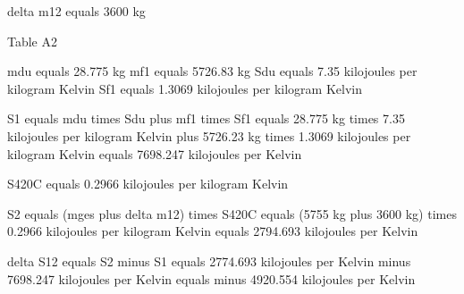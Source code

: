 delta m12 equals 3600 kg  

Table A2  

mdu equals 28.775 kg  
mf1 equals 5726.83 kg  
Sdu equals 7.35 kilojoules per kilogram Kelvin  
Sf1 equals 1.3069 kilojoules per kilogram Kelvin  

S1 equals mdu times Sdu plus mf1 times Sf1  
equals 28.775 kg times 7.35 kilojoules per kilogram Kelvin plus 5726.23 kg times 1.3069 kilojoules per kilogram Kelvin  
equals 7698.247 kilojoules per Kelvin  

S420C equals 0.2966 kilojoules per kilogram Kelvin  

S2 equals (mges plus delta m12) times S420C  
equals (5755 kg plus 3600 kg) times 0.2966 kilojoules per kilogram Kelvin  
equals 2794.693 kilojoules per Kelvin  

delta S12 equals S2 minus S1  
equals 2774.693 kilojoules per Kelvin minus 7698.247 kilojoules per Kelvin  
equals minus 4920.554 kilojoules per Kelvin